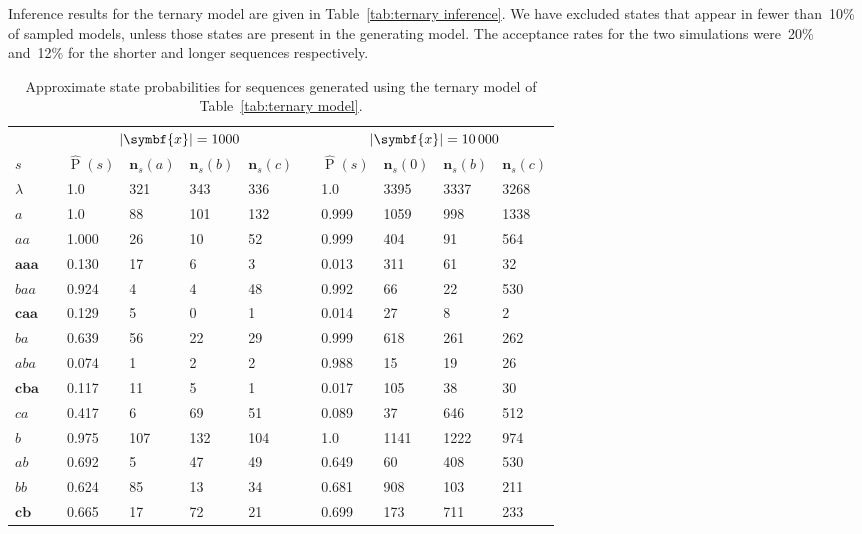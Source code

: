 \documentclass[12pt,a4paper]{article}
\newcommand\ub[1]{\symbf{#1}}                 %
\DeclareMathOperator\Pb{P}                    %
\DeclarePairedDelimiter\abs{\lvert}{\rvert}   %
\begin{document}
Inference results for the ternary model are given in Table~\ref{tab:ternary
inference}. We have excluded states that appear in fewer than~10\% of sampled
models, unless those states are present in the generating model. The acceptance
rates for the two simulations were~20\% and~12\% for the shorter and longer
sequences respectively.
%
\begin{table}[htbp]
\centering
\begin{tabular}{lcllllcllll}
  \toprule
  & \quad & \multicolumn{4}{c}{\(\abs{\ub{x}} = 1000\)}
  & \quad & \multicolumn{4}{c}{\(\abs{\ub{x}} = 10\,000\)} \\
  \cmidrule{3-6} \cmidrule{8-11}
  \(s\)
  && \(\hat{\Pb}(s)\) & \(\ub{n}_s(a)\) & \(\ub{n}_s(b)\) & \(\ub{n}_s(c)\)
  && \(\hat{\Pb}(s)\) & \(\ub{n}_s(0)\) & \(\ub{n}_s(b)\) & \(\ub{n}_s(c)\) \\
  \midrule
  \(\lambda\)  && 1.0   & 321 & 343 & 336 && 1.0   & 3395 & 3337 & 3268 \\
  \(a\)        && 1.0   & 88  & 101 & 132 && 0.999 & 1059 & 998  & 1338 \\
  \(aa\)       && 1.000 & 26  & 10  & 52  && 0.999 & 404  & 91   & 564  \\
  \(\ub{aaa}\) && 0.130 & 17  & 6   & 3   && 0.013 & 311  & 61   & 32   \\
  \(baa\)      && 0.924 & 4   & 4   & 48  && 0.992 & 66   & 22   & 530  \\
  \(\ub{caa}\) && 0.129 & 5   & 0   & 1   && 0.014 & 27   & 8    & 2    \\
  \(ba\)       && 0.639 & 56  & 22  & 29  && 0.999 & 618  & 261  & 262  \\
  \(aba\)      && 0.074 & 1   & 2   & 2   && 0.988 & 15   & 19   & 26   \\
  \(\ub{cba}\) && 0.117 & 11  & 5   & 1   && 0.017 & 105  & 38   & 30   \\
  \(ca\)       && 0.417 & 6   & 69  & 51  && 0.089 & 37   & 646  & 512  \\
  \(b\)        && 0.975 & 107 & 132 & 104 && 1.0   & 1141 & 1222 & 974  \\
  \(ab\)       && 0.692 & 5   & 47  & 49  && 0.649 & 60   & 408  & 530  \\
  \(bb\)       && 0.624 & 85  & 13  & 34  && 0.681 & 908  & 103  & 211  \\
  \(\ub{cb}\)  && 0.665 & 17  & 72  & 21  && 0.699 & 173  & 711  & 233  \\
  \bottomrule
\end{tabular}
\caption{Approximate state probabilities for sequences generated using the
  ternary model of Table~\ref{tab:ternary model}.}
\label{tab:ternary inference}
\end{table}
\end{document}

